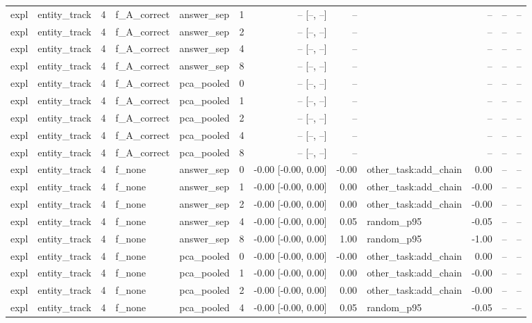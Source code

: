 \begin{tabular}{llrllrrrlrrr}
expl & entity\_track & 4 & f\_A\_correct & answer\_sep & 1 & -- [--, --] & -- &  & -- & -- & -- \\
expl & entity\_track & 4 & f\_A\_correct & answer\_sep & 2 & -- [--, --] & -- &  & -- & -- & -- \\
expl & entity\_track & 4 & f\_A\_correct & answer\_sep & 4 & -- [--, --] & -- &  & -- & -- & -- \\
expl & entity\_track & 4 & f\_A\_correct & answer\_sep & 8 & -- [--, --] & -- &  & -- & -- & -- \\
expl & entity\_track & 4 & f\_A\_correct & pca\_pooled & 0 & -- [--, --] & -- &  & -- & -- & -- \\
expl & entity\_track & 4 & f\_A\_correct & pca\_pooled & 1 & -- [--, --] & -- &  & -- & -- & -- \\
expl & entity\_track & 4 & f\_A\_correct & pca\_pooled & 2 & -- [--, --] & -- &  & -- & -- & -- \\
expl & entity\_track & 4 & f\_A\_correct & pca\_pooled & 4 & -- [--, --] & -- &  & -- & -- & -- \\
expl & entity\_track & 4 & f\_A\_correct & pca\_pooled & 8 & -- [--, --] & -- &  & -- & -- & -- \\
expl & entity\_track & 4 & f\_none & answer\_sep & 0 & -0.00 [-0.00, 0.00] & -0.00 & other\_task:add\_chain & 0.00 & -- & -- \\
expl & entity\_track & 4 & f\_none & answer\_sep & 1 & -0.00 [-0.00, 0.00] & 0.00 & other\_task:add\_chain & -0.00 & -- & -- \\
expl & entity\_track & 4 & f\_none & answer\_sep & 2 & -0.00 [-0.00, 0.00] & 0.00 & other\_task:add\_chain & -0.00 & -- & -- \\
expl & entity\_track & 4 & f\_none & answer\_sep & 4 & -0.00 [-0.00, 0.00] & 0.05 & random\_p95 & -0.05 & -- & -- \\
expl & entity\_track & 4 & f\_none & answer\_sep & 8 & -0.00 [-0.00, 0.00] & 1.00 & random\_p95 & -1.00 & -- & -- \\
expl & entity\_track & 4 & f\_none & pca\_pooled & 0 & -0.00 [-0.00, 0.00] & -0.00 & other\_task:add\_chain & 0.00 & -- & -- \\
expl & entity\_track & 4 & f\_none & pca\_pooled & 1 & -0.00 [-0.00, 0.00] & 0.00 & other\_task:add\_chain & -0.00 & -- & -- \\
expl & entity\_track & 4 & f\_none & pca\_pooled & 2 & -0.00 [-0.00, 0.00] & 0.00 & other\_task:add\_chain & -0.00 & -- & -- \\
expl & entity\_track & 4 & f\_none & pca\_pooled & 4 & -0.00 [-0.00, 0.00] & 0.05 & random\_p95 & -0.05 & -- & -- \\

\end{tabular}
